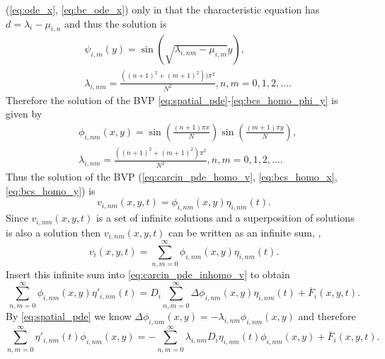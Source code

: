 \documentclass[\main/thesis.tex]{subfiles}
\begin{document}
(\ref{eq:ode_x}, \ref{eq:bc_ode_x}) only in that the characteristic equation has 
$d {=} \lambda_i {-} \mu_{i,n}$ and thus the solution is
\begin{align*}
	&\psi_{i,m}(y)   {=} \sin(\sqrt{\lambda_{i,nm} {-} \mu_{i,m}} y), \\
	&\lambda_{i,nm} {=} \frac{((n {+} 1)^2 {+} (m {+} 1)^2)) \pi^2}
	                          {N^2},
	 n, m {=} 0, 1, 2, ....
\end{align*}
Therefore the solution of the BVP 
\eqref{eq:spatial_pde}-\eqref{eq:bcs_homo_phi_y} is given by
\begin{align}
	&\phi_{i,nm}(x, y) {=} \sin\left( 
	                              \frac{(n {+} 1) \pi x}
	                                   {N} 
	                            \right)
	                        \sin\left(
	                              \frac{(m {+} 1) \pi y}
	                                   {N}
	                            \right),
	 \label{eq:spatial_sol} \\
	&\lambda_{i,nm}    {=} \frac{((n {+} 1)^2 {+} (m {+} 1)^2) \pi^2}
	                            {N^2},
	 n,m {=} 0, 1, 2, ....
	 \label{eq:sep_const}
\end{align}
Thus the solution of the BVP (\ref{eq:carcin_pde_homo_v}, \ref{eq:bcs_homo_x}, 
\ref{eq:bcs_homo_y}) is
\begin{equation*}
	v_{i,nm}(x, y, t) {=} \phi_{i,nm}(x, y) \eta_{i,nm}(t).
\end{equation*}
Since $v_{i,nm}(x, y, t)$ is a set of infinite solutions and a superposition of 
solutions is also a solution then $v_{i,nm}(x, y, t)$ can be written as an 
infinite sum, \ie,
\begin{equation}
	v_i(x, y, t) {=} \sum_{n,m {=} 0}^{\infty} \phi_{i,nm}(x, y) \eta_{i,nm}(t).
	\label{eq:variable_sol}
\end{equation}
Insert this infinite sum into \eqref{eq:carcin_pde_inhomo_v} to obtain 
\begin{equation*}
	    \sum_{n,m {=} 0}^{\infty} \phi_{i,nm}(x, y) \eta'_{i,nm}(t)
	{=} D_i \sum_{n,m {=} 0}^{\infty} \Delta \phi_{i,nm}(x, y) \eta_{i,nm}(t) 
	{+} \overline{F}_i(x, y, t). 
\end{equation*}
By \eqref{eq:spatial_pde} we know
$\Delta \phi_{i,nm}(x, y) {=} \minus \lambda_{i,nm} \phi_{i,nm}(x, y)$ and therefore
\begin{equation*}
	    \sum_{n,m {=} 0}^{\infty} \eta'_{i,nm}(t) \phi_{i,nm}(x, y) 
	{=} {-} \sum_{n,m {=} 0}^{\infty} \lambda_{i,nm} D_i \eta_{i,nm}(t) 
	                                  \phi_{i,nm}(x, y) 
	{+} \overline{F}_i(x, y, t).
\end{equation*}
\end{document}
